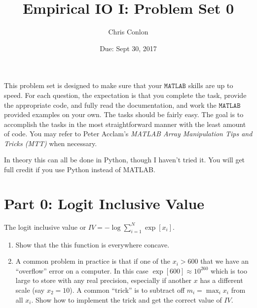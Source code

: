 \documentclass{article}
\begin{document}
\title{Empirical IO I: Problem Set 0}
\author{Chris Conlon}
\date{Due: Sept 30, 2017}
\maketitle
This problem set is designed to make sure that your $\mathtt{MATLAB}$ skills are up to speed. For each question, the expectation is that you complete the task, provide the appropriate code, and fully read the documentation, and work the $\mathtt{MATLAB}$ provided examples on your own.  The tasks should be fairly easy.  The goal is to accomplish the tasks in the most straightforward manner with the least amount of code.  You may refer to Peter Acclam's \emph{MATLAB Array Manipulation Tips and Tricks (MTT)} when necessary.

In theory this can all be done in Python, though I haven't tried it. You will get full credit if you use Python instead of MATLAB.


\section*{Part 0: Logit Inclusive Value}
The logit inclusive value or $IV = -\log \sum_{i=1}^N \exp[x_i]$.
\begin{enumerate}
\item Show that the this function is everywhere concave.
\item A common problem in practice is that if one of the $x_i > 600$ that we have an ``overflow'' error on a computer. In this case $\exp[600] \approx 10^{260}$ which is too large to store with any real precision, especially if another $x$ has a different scale (say $x_2=10$). A common ``trick'' is to subtract off $m_i = \max_i x_i$ from all $x_i$.  Show how to implement the trick and get the correct value of $IV$.
\end{enumerate}
\end{document}
